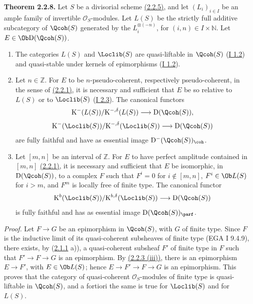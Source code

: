 \textbf{Theorem 2.2.8.} Let $S$ be a divisorial scheme \hyperlink{sga6.e02.def.2-2-5}{(2.2.5)}, and let $(L_i)_{i\in I}$ be an ample family of invertible $\mathcal O_S$-modules. Let $L(S)$ be the strictly full additive subcategory of $\Qcoh(S)$ generated by the $L_i^{\otimes(-n)}$, for $(i,n)\in I\times\mathbb N$. Let $E\in\Ob\mathrm D(\Qcoh(S))$.
\begin{enumerate}[label=\alph*)]
\item The categories $L(S)$ and $\Loclib(S)$ are quasi-liftable in $\Qcoh(S)$ (\hyperlink{sga6.e01.sec.1.2}{I 1.2}) and quasi-stable under kernels of epimorphisms (\hyperlink{sga6.e01.sec.1.2}{I 1.2}).
\item Let $n\in\mathbb Z$. For $E$ to be $n$-pseudo-coherent, respectively pseudo-coherent, in the sense of \hyperlink{sga6.e02.notation.2-2-1}{(2.2.1)}, it is necessary and sufficient that $E$ be so relative to $L(S)$ or to $\Loclib(S)$ (\hyperlink{sga6.e01.def.2-3}{I 2.3}). The canonical functors
\[
\mathrm K^{-}(L(S))/\mathrm K^{-,\delta}(L(S))\longrightarrow \mathrm D(\Qcoh(S)),
\]
\[
\mathrm K^{-}(\Loclib(S))/\mathrm K^{-,\delta}(\Loclib(S))\longrightarrow \mathrm D(\Qcoh(S))
\]
are fully faithful and have as essential image $\mathrm D^{-}(\Qcoh(S))_{\coh}$.
\item Let $[m,n]$ be an interval of $\mathbb Z$. For $E$ to have perfect amplitude contained in $[m,n]$ \hyperlink{sga6.e02.notation.2-2-1}{(2.2.1)}, it is necessary and sufficient that $E$ be isomorphic, in $\mathrm D(\Qcoh(S))$, to a complex $F$ such that $F^i=0$ for $i\notin[m,n]$, $F^i\in\Ob L(S)$ for $i>m$, and $F^m$ is locally free of finite type. The canonical functor
\[
\mathrm K^b(\Loclib(S))/\mathrm K^{b,\delta}(\Loclib(S))\longrightarrow \mathrm D(\Qcoh(S))
\]
is fully faithful and has as essential image $\mathrm D(\Qcoh(S))_{\parf}$.
\end{enumerate}

\emph{Proof.} Let $F\to G$ be an epimorphism in $\Qcoh(S)$, with $G$ of finite type. Since $F$ is the inductive limit of its quasi-coherent subsheaves of finite type (EGA I 9.4.9), there exists, by (\hyperlink{sga6.e02.lem.2-1-1}{2.1.1} a)), a quasi-coherent subsheaf $F'$ of finite type in $F$ such that $F'\to F\to G$ is an epimorphism. By \hyperlink{sga6.e02.prop.2-2-3}{(2.2.3 (iii))}, there is an epimorphism $E\to F'$, with $E\in\Ob L(S)$; hence $E\to F'\to F\to G$ is an epimorphism. This proves that the category of quasi-coherent $\mathcal O_S$-modules of finite type is quasi-liftable in $\Qcoh(S)$, and a fortiori the same is true for $\Loclib(S)$ and for $L(S)$.

